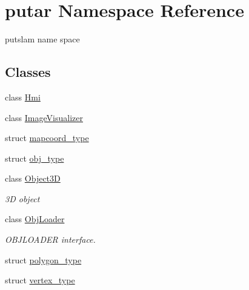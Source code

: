 \hypertarget{namespaceputar}{}\section{putar Namespace Reference}
\label{namespaceputar}


putslam name space  


\subsection*{Classes}
\begin{DoxyCompactItemize}
\item 
class \hyperlink{classputar_1_1Hmi}{Hmi}
\item 
class \hyperlink{classputar_1_1ImageVisualizer}{Image\+Visualizer}
\item 
struct \hyperlink{structputar_1_1mapcoord__type}{mapcoord\+\_\+type}
\item 
struct \hyperlink{structputar_1_1obj__type}{obj\+\_\+type}
\item 
class \hyperlink{classputar_1_1Object3D}{Object3D}
\begin{DoxyCompactList}\small\item\em 3D object \end{DoxyCompactList}\item 
class \hyperlink{classputar_1_1ObjLoader}{Obj\+Loader}
\begin{DoxyCompactList}\small\item\em O\+B\+J\+L\+O\+A\+D\+ER interface. \end{DoxyCompactList}\item 
struct \hyperlink{structputar_1_1polygon__type}{polygon\+\_\+type}
\item 
struct \hyperlink{structputar_1_1vertex__type}{vertex\+\_\+type}
\end{DoxyCompactItemize}
